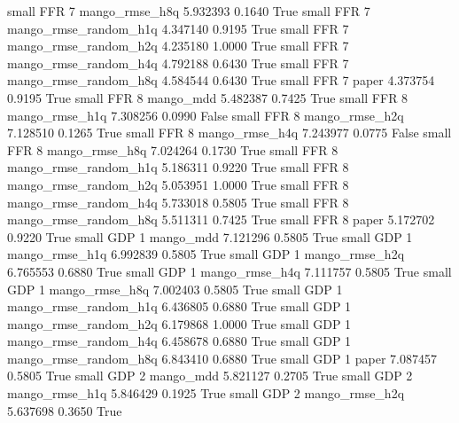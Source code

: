      small      FFR                 7        mango_rmse_h8q   5.932393      0.1640    True
     small      FFR                 7 mango_rmse_random_h1q   4.347140      0.9195    True
     small      FFR                 7 mango_rmse_random_h2q   4.235180      1.0000    True
     small      FFR                 7 mango_rmse_random_h4q   4.792188      0.6430    True
     small      FFR                 7 mango_rmse_random_h8q   4.584544      0.6430    True
     small      FFR                 7                 paper   4.373754      0.9195    True
     small      FFR                 8             mango_mdd   5.482387      0.7425    True
     small      FFR                 8        mango_rmse_h1q   7.308256      0.0990   False
     small      FFR                 8        mango_rmse_h2q   7.128510      0.1265    True
     small      FFR                 8        mango_rmse_h4q   7.243977      0.0775   False
     small      FFR                 8        mango_rmse_h8q   7.024264      0.1730    True
     small      FFR                 8 mango_rmse_random_h1q   5.186311      0.9220    True
     small      FFR                 8 mango_rmse_random_h2q   5.053951      1.0000    True
     small      FFR                 8 mango_rmse_random_h4q   5.733018      0.5805    True
     small      FFR                 8 mango_rmse_random_h8q   5.511311      0.7425    True
     small      FFR                 8                 paper   5.172702      0.9220    True
     small      GDP                 1             mango_mdd   7.121296      0.5805    True
     small      GDP                 1        mango_rmse_h1q   6.992839      0.5805    True
     small      GDP                 1        mango_rmse_h2q   6.765553      0.6880    True
     small      GDP                 1        mango_rmse_h4q   7.111757      0.5805    True
     small      GDP                 1        mango_rmse_h8q   7.002403      0.5805    True
     small      GDP                 1 mango_rmse_random_h1q   6.436805      0.6880    True
     small      GDP                 1 mango_rmse_random_h2q   6.179868      1.0000    True
     small      GDP                 1 mango_rmse_random_h4q   6.458678      0.6880    True
     small      GDP                 1 mango_rmse_random_h8q   6.843410      0.6880    True
     small      GDP                 1                 paper   7.087457      0.5805    True
     small      GDP                 2             mango_mdd   5.821127      0.2705    True
     small      GDP                 2        mango_rmse_h1q   5.846429      0.1925    True
     small      GDP                 2        mango_rmse_h2q   5.637698      0.3650    True
